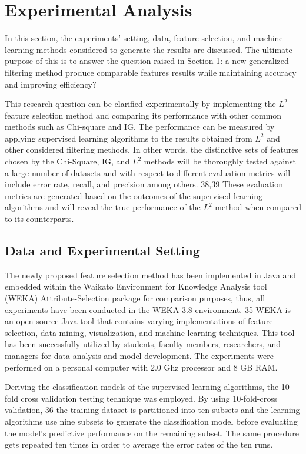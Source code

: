 \documentclass[review]{elsarticle}
\begin{document}
\section{Experimental Analysis }

In this section, the experiments’ setting, data, feature selection, and machine learning methods considered to generate the results are discussed. The ultimate purpose of this is to answer the question raised in Section 1: a new generalized filtering method produce comparable features results while maintaining accuracy and improving efficiency?

This research question can be clarified experimentally by implementing the $ L^2 $ feature selection method and comparing its performance with other common methods such as Chi-square and IG. The performance can be measured by applying supervised learning algorithms to the results obtained from $ L^2 $ and other considered filtering methods. In other words, the distinctive sets of features chosen by the Chi-Square, IG, and $ L^2 $ methods will be thoroughly tested against a large number of datasets and with respect to different evaluation metrics will include error rate, recall, and precision among others.\cite{Hegde2014, Thabtah2018} 38,39 These evaluation metrics are generated based on the outcomes of the supervised learning algorithms and will reveal the true performance of the $ L^2 $ method when compared to its counterparts.

\subsection{Data and Experimental Setting }

The newly proposed feature selection method has been implemented in Java and embedded within the Waikato Environment for Knowledge Analysis tool (WEKA) Attribute-Selection package for comparison purposes, thus, all experiments have been conducted in the WEKA 3.8 environment.\cite{Hall2009} 35  WEKA is an open source Java tool that contains varying implementations of feature selection, data mining, visualization, and machine learning techniques. This tool has been successfully utilized by students, faculty members, researchers, and managers for data analysis and model development. The experiments were performed on a personal computer with 2.0 Ghz processor and 8 GB RAM. 

Deriving the classification models of the supervised learning algorithms, the 10-fold cross validation testing technique was employed. By using 10-fold-cross validation, \cite{Shahamiri2014} 36  the training dataset is partitioned into ten subsets and the learning algorithms use nine subsets to generate the classification model before evaluating the model’s predictive performance on the remaining subset. The same procedure gets repeated ten times in order to average the error rates of the ten runs.
\end{document}
